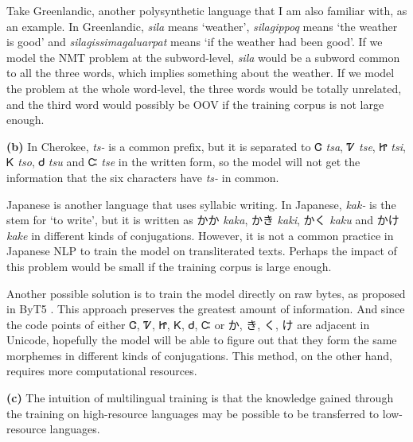 \documentclass[a4paper,12pt]{report}
\newcommand{\cherokeefam}[1]{{\cherokeefama #1}}
\newcommand{\japanesefam}[1]{{\japanesefama #1}}
\newcommand{\greenlandicfam}[1]{{\greenlandicfama #1}}
\begin{document}
Take Greenlandic, another polysynthetic language that I am also familiar with, as an example. In Greenlandic, \textit{\greenlandicfam{sila}} means `weather', \textit{\greenlandicfam{silagippoq}} means `the weather is good' and \textit{\greenlandicfam{silagissimagaluarpat}} means `if the weather had been good'. If we model the NMT problem at the subword-level, \textit{sila} would be a subword common to all the three words, which implies something about the weather. If we model the problem at the whole word-level, the three words would be totally unrelated, and the third word would possibly be OOV if the training corpus is not large enough.

\textbf{(b)} In Cherokee, \textit{ts-} is a common prefix, but it is separated to \cherokeefam{Ꮳ}  \textit{tsa}, \cherokeefam{Ꮴ} \textit{tse}, \cherokeefam{Ꮵ} \textit{tsi}, \cherokeefam{Ꮶ} \textit{tso}, \cherokeefam{Ꮷ} \textit{tsu} and \cherokeefam{Ꮸ} \textit{tse} in the written form, so the model will not get the information that the six characters have \textit{ts-} in common.

Japanese is another language that uses syllabic writing. In Japanese, \textit{kak-} is the stem for `to write', but it is written as \japanesefam{かか} \textit{kaka}, \japanesefam{かき} \textit{kaki}, \japanesefam{かく} \textit{kaku} and \japanesefam{かけ} \textit{kake} in different kinds of conjugations. However, it is not a common practice in Japanese NLP to train the model on transliterated texts. Perhaps the impact of this problem would be small if the training corpus is large enough.

\newpage

Another possible solution is to train the model directly on raw bytes, as proposed in ByT5 \cite{byt5}. This approach preserves the greatest amount of information. And since the code points of either \cherokeefam{Ꮳ}, \cherokeefam{Ꮴ}, \cherokeefam{Ꮵ}, \cherokeefam{Ꮶ}, \cherokeefam{Ꮷ}, \cherokeefam{Ꮸ} or \japanesefam{か}, \japanesefam{き}, \japanesefam{く}, \japanesefam{け} are adjacent in Unicode, hopefully the model will be able to figure out that they form the same morphemes in different kinds of conjugations. This method, on the other hand, requires more computational resources.

\textbf{(c)} The intuition of multilingual training is that the knowledge gained through the training on high-resource languages may be possible to be transferred to low-resource languages.
\end{document}
